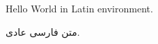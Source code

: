 \documentclass{matinbook}
\begin{document}
\begin{latin}
Hello World in Latin environment.
\end{latin}
متن فارسی عادی.
\end{document}
